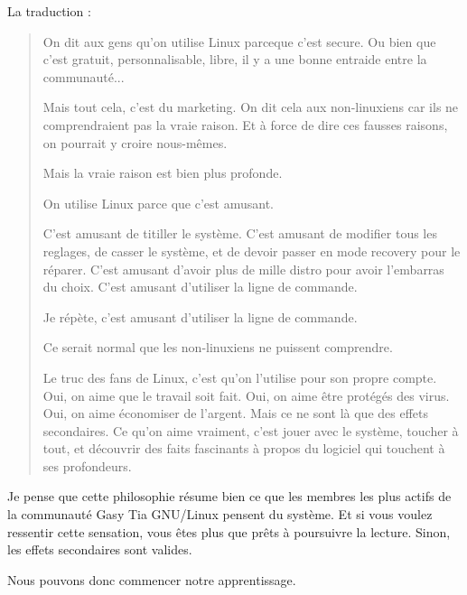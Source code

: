 La traduction :

\begin{quotation}
  On dit aux gens qu'on utilise Linux parceque c'est secure. Ou bien que c'est
  gratuit, personnalisable, libre, il y a une bonne entraide entre la communauté...

  Mais tout cela, c'est du marketing. On dit cela aux non-linuxiens car ils ne
  comprendraient pas la vraie raison. Et à force de dire ces fausses raisons, on
  pourrait y croire nous-mêmes.

  Mais la vraie raison est bien plus profonde.

  On utilise Linux parce que c'est amusant.

  C'est amusant de titiller le système. C'est amusant de modifier tous les
  reglages, de casser le système, et de devoir passer en mode recovery pour le
  réparer. C'est amusant d'avoir plus de mille distro pour avoir l'embarras du
  choix. C'est amusant d'utiliser la ligne de commande.

  Je répète, c'est amusant d'utiliser la ligne de commande.

  Ce serait normal que les non-linuxiens ne puissent comprendre.

  Le truc des fans de Linux, c'est qu'on l'utilise pour son propre compte. Oui,
  on aime que le travail soit fait. Oui, on aime être protégés des virus. Oui,
  on aime économiser de l'argent. Mais ce ne sont là que des effets secondaires.
  Ce qu'on aime vraiment, c'est jouer avec le système, toucher à tout, et
  découvrir des faits fascinants à propos du logiciel qui touchent à ses profondeurs.
\end{quotation}

Je pense que cette philosophie résume bien ce que les membres les plus actifs de
la communauté Gasy Tia GNU/Linux pensent du système. Et si vous voulez ressentir
cette sensation, vous êtes plus que prêts à poursuivre la lecture. Sinon, les
effets secondaires sont valides.

Nous pouvons donc commencer notre apprentissage.
